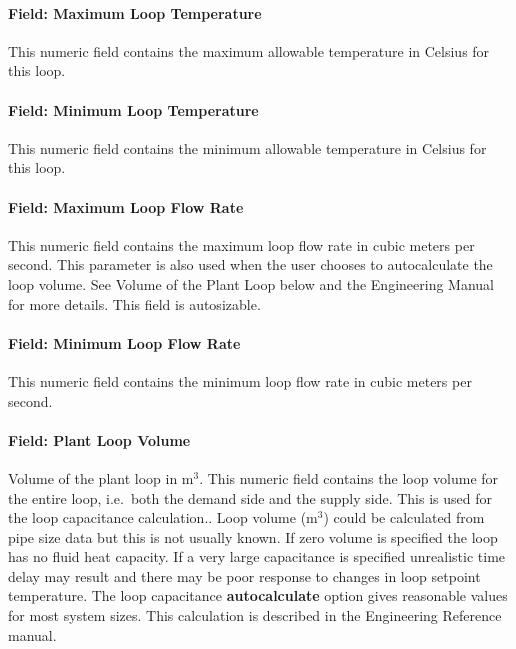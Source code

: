 \paragraph{Field: Maximum Loop Temperature}\label{field-maximum-loop-temperature}

This numeric field contains the maximum allowable temperature in Celsius for this loop.

\paragraph{Field: Minimum Loop Temperature}\label{field-minimum-loop-temperature}

This numeric field contains the minimum allowable temperature in Celsius for this loop.

\paragraph{Field: Maximum Loop Flow Rate}\label{field-maximum-loop-flow-rate}

This numeric field contains the maximum loop flow rate in cubic meters per second. This parameter is also used when the user chooses to autocalculate the loop volume. See Volume of the Plant Loop below and the Engineering Manual for more details. This field is autosizable.

\paragraph{Field: Minimum Loop Flow Rate}\label{field-minimum-loop-flow-rate}

This numeric field contains the minimum loop flow rate in cubic meters per second.

\paragraph{Field: Plant Loop Volume}\label{field-plant-loop-volume}

Volume of the plant loop in m\(^{3}\). This numeric field contains the loop volume for the entire loop, i.e.~both the demand side and the supply side. This is used for the loop capacitance calculation.. Loop volume (m\(^{3}\)) could be calculated from pipe size data but this is not usually known. If zero volume is specified the loop has no fluid heat capacity. If a very large capacitance is specified unrealistic time delay may result and there may be poor response to changes in loop setpoint temperature. The loop capacitance \textbf{autocalculate} option gives reasonable values for most system sizes. This calculation is described in the Engineering Reference manual.

